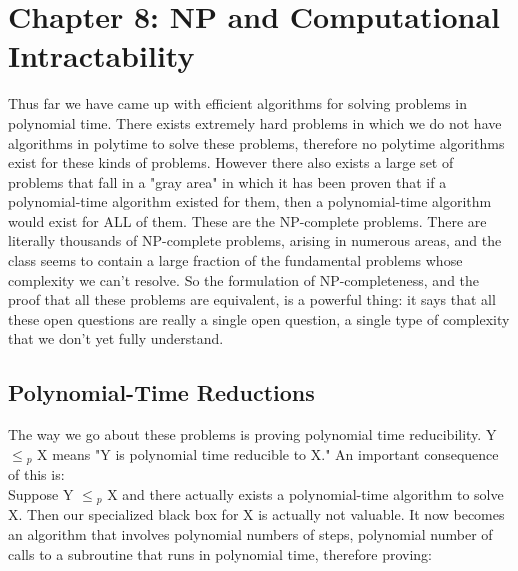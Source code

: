 \documentclass{article}
\begin{document}
\section{Chapter 8: NP and Computational Intractability}
 Thus far we have came up with efficient algorithms for solving problems in polynomial time. There exists extremely hard problems in which we do not have algorithms in polytime to solve these problems, therefore no polytime algorithms exist for these kinds of problems. However there also exists a large set of problems that fall in a "gray area" in which it has been proven that if a polynomial-time algorithm existed for them, then a polynomial-time algorithm would exist for ALL of them. These are the NP-complete problems. There are literally thousands of NP-complete problems, arising in numerous areas, and the class seems to contain a large fraction of the fundamental problems whose complexity we can’t resolve. So the formulation of NP-completeness, and the proof that all these problems are equivalent, is a powerful thing: it says that all these open questions are really a single open question, a single type of complexity that we don’t yet fully understand.

 \subsection{Polynomial-Time Reductions}
 The way we go about these problems is proving polynomial time reducibility. Y $\le$$_p$ X means "Y is polynomial time reducible to X." An important consequence of this is:\\

 Suppose Y $\le$$_p$ X and there actually exists a polynomial-time algorithm to solve X. Then our specialized black box for X is actually not valuable. It now becomes an algorithm that involves polynomial numbers of steps, polynomial number of calls to a subroutine that runs in polynomial time, therefore proving:\\

 \\
\end{document}
